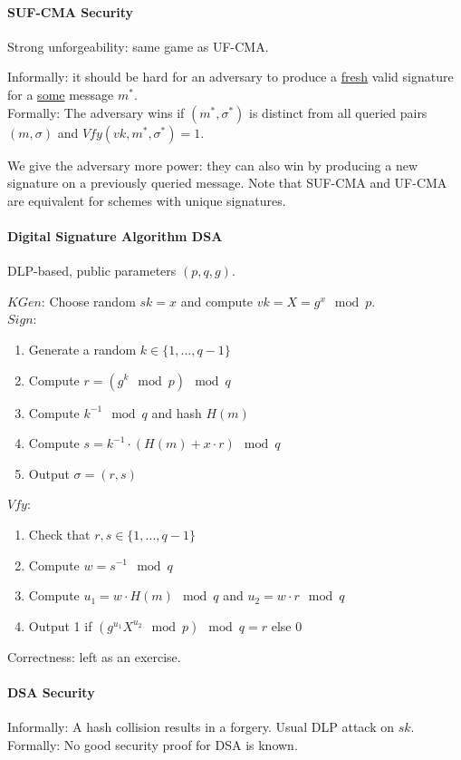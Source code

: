 \paragraph{SUF-CMA Security}
Strong unforgeability: same game as UF-CMA.

Informally:
it should be hard for an adversary to produce a \underline{fresh} valid signature for a \underline{some} message $m^*$.
\\
Formally:
The adversary wins if $(m^*, \sigma^*)$ is distinct from all queried pairs $(m, \sigma)$ and $Vfy(vk, m^*, \sigma^*) = 1$.

We give the adversary more power: they can also win by producing a new signature on a previously queried message.
Note that SUF-CMA and UF-CMA are equivalent for schemes with unique signatures.

\paragraph{Digital Signature Algorithm DSA}
DLP-based, public parameters $(p,q,g)$.

$KGen$: Choose random $sk = x$ and compute $vk = X = g^x \mod p$.
\\
$Sign$:
\begin{enumerate}
\item Generate a random $k \in \{1, ..., q-1\}$
\item Compute $r = (g^k \mod p) \mod q$
\item Compute $k^{-1} \mod q$ and hash $H(m)$
\item Compute $s = k^{-1} \cdot (H(m) + x \cdot r) \mod q$
\item Output $\sigma = (r, s)$
\end{enumerate}
%
$Vfy$:
\begin{enumerate}
\item Check that $r, s \in \{1, ..., q-1\}$
\item Compute $w = s^{-1} \mod q$
\item Compute $u_1 = w \cdot H(m) \mod q$ and $u_2 = w \cdot r \mod q$
\item Output 1 if $(g^{u_1} X^{u_2} \mod p) \mod q = r$ else 0
\end{enumerate}
%
Correctness: left as an exercise.

\paragraph{DSA Security}
Informally:
A hash collision results in a forgery. Usual DLP attack on $sk$.
\\
Formally:
No good security proof for DSA is known.


